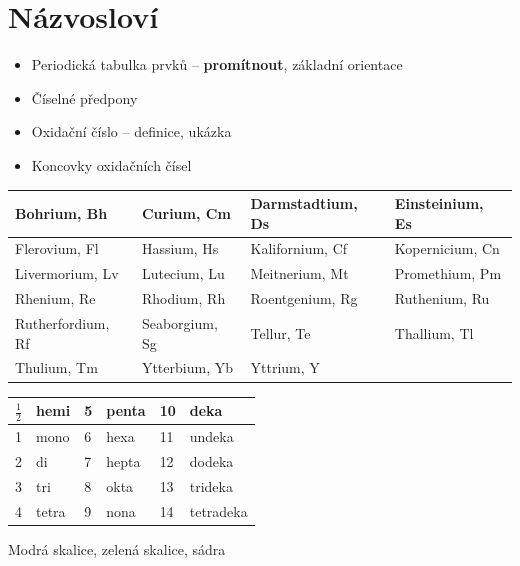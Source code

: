 
\section{Názvosloví}

\begin{itemize}
	\item Periodická tabulka prvků -- \textbf{promítnout}, základní orientace
	\item Číselné předpony
	\item Oxidační číslo -- definice, ukázka
	\item Koncovky oxidačních čísel
\end{itemize}

\begin{tabular}{|l|l|l|l|}
	\hline
	Bohrium, Bh & Curium, Cm & Darmstadtium, Ds & Einsteinium, Es \\\hline
	Flerovium, Fl & Hassium, Hs & Kalifornium, Cf & Kopernicium, Cn \\\hline
	Livermorium, Lv & Lutecium, Lu & Meitnerium, Mt & Promethium, Pm \\\hline
	Rhenium, Re & Rhodium, Rh & Roentgenium, Rg & Ruthenium, Ru \\\hline
	Rutherfordium, Rf & Seaborgium, Sg & Tellur, Te & Thallium, Tl \\\hline
	Thulium, Tm & Ytterbium, Yb & Yttrium, Y &  \\\hline
\end{tabular}

\begin{tabular}{|l|l|l|l|l|l|}
	\hline
	$\frac{1}{2}$ & hemi & 5 & penta & 10 & deka \\\hline
	1 & mono & 6 & hexa & 11 & undeka \\\hline
	2 & di & 7 & hepta & 12 & dodeka \\\hline
	3 & tri & 8 & okta & 13 & trideka \\\hline
	4 & tetra & 9 & nona & 14 & tetradeka \\\hline
\end{tabular}

Modrá skalice, zelená skalice, sádra

